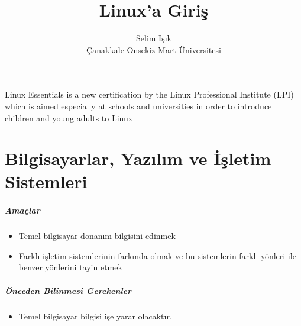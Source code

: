 \documentclass[10pt,a5paper]{book}
\begin{document}
\title{Linux'a Giriş}
\author{Selim Işık\\
Çanakkale Onsekiz Mart Üniversitesi}
\renewcommand{\today}{December 13, 2012}
\renewcommand*\chaptername{Bölüm}
\maketitle
Linux Essentials is a new certification by the Linux Professional Institute (LPI) which is aimed especially at schools and universities in order to introduce children and young adults to Linux
\renewcommand*\contentsname{İçindekiler}
\tableofcontents
\listoftables
\chapter{Bilgisayarlar, Yazılım ve İşletim Sistemleri}
\paragraph{Amaçlar}
\begin{itemize}
 \item Temel bilgisayar donanım bilgisini edinmek
 \item Farklı işletim sistemlerinin farkında olmak ve bu sistemlerin farklı yönleri ile benzer yönlerini tayin etmek
 \end{itemize}
 
\paragraph{Önceden Bilinmesi Gerekenler}
\begin{itemize}
 \item Temel bilgisayar bilgisi işe yarar olacaktır.
 \end{itemize}
\end{document}
